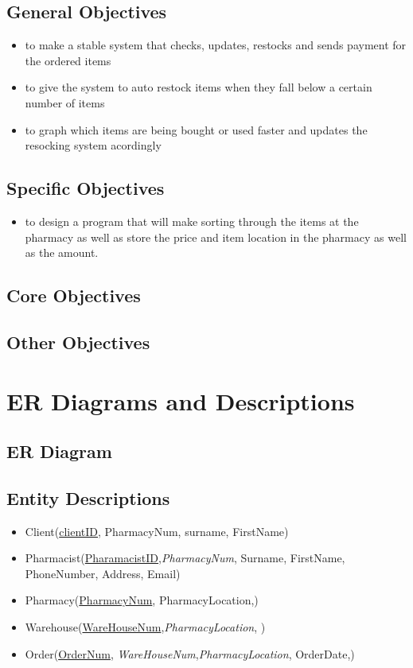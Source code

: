 \subsection{General Objectives}
\begin{itemize}
	\item to make a stable system that checks, updates, restocks and sends payment for the ordered items
	\item to give the system to auto restock items when they fall below a certain number of items
	\item to graph which items are being bought or used faster and updates the resocking system acordingly 
\end{itemize}
\subsection{Specific Objectives}
\begin{itemize}
	\item to design a program that will make sorting through the items at the pharmacy as well as store the price and item location in the pharmacy as well as the amount.
\end{itemize}
\subsection{Core Objectives}

\subsection{Other Objectives}

\section{ER Diagrams and Descriptions}

\subsection{ER Diagram}

\subsection{Entity Descriptions}
\begin{itemize}
\item Client(\underline{clientID}, PharmacyNum, surname, FirstName)
\item Pharmacist(\underline{PharamacistID},\emph{PharmacyNum}, Surname, FirstName, PhoneNumber, Address, Email)
\item Pharmacy(\underline{PharmacyNum}, PharmacyLocation,)
\item Warehouse(\underline{WareHouseNum},\emph{PharmacyLocation}, )
\item Order(\underline{OrderNum}, \emph{WareHouseNum},\emph{PharmacyLocation}, OrderDate,)
\end{itemize}
